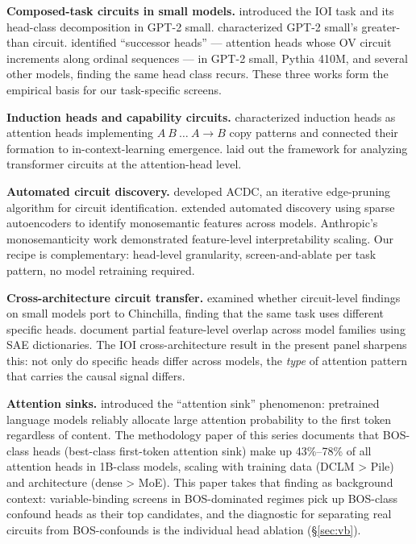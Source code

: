 \documentclass[11pt]{article}
\begin{document}
\textbf{Composed-task circuits in small models.} \citet{wang2022ioi} introduced the IOI task and its head-class decomposition in GPT-2 small. \citet{hanna2023greater} characterized GPT-2 small's greater-than circuit. \citet{gould2023successor} identified ``successor heads'' --- attention heads whose OV circuit increments along ordinal sequences --- in GPT-2 small, Pythia 410M, and several other models, finding the same head class recurs. These three works form the empirical basis for our task-specific screens.

\textbf{Induction heads and capability circuits.} \citet{olsson2022induction} characterized induction heads as attention heads implementing $A\ B\ \ldots\ A \to B$ copy patterns and connected their formation to in-context-learning emergence. \citet{elhage2021mathematical} laid out the framework for analyzing transformer circuits at the attention-head level.

\textbf{Automated circuit discovery.} \citet{conmy2023acdc} developed ACDC, an iterative edge-pruning algorithm for circuit identification. \citet{marks2024sparsefeature} extended automated discovery using sparse autoencoders to identify monosemantic features across models. Anthropic's monosemanticity work \citep{templeton2024monosemanticity} demonstrated feature-level interpretability scaling. Our recipe is complementary: head-level granularity, screen-and-ablate per task pattern, no model retraining required.

\textbf{Cross-architecture circuit transfer.} \citet{lieberum2023chinchilla} examined whether circuit-level findings on small models port to Chinchilla, finding that the same task uses different specific heads. \citet{marks2024sparsefeature} document partial feature-level overlap across model families using SAE dictionaries. The IOI cross-architecture result in the present panel sharpens this: not only do specific heads differ across models, the \emph{type} of attention pattern that carries the causal signal differs.

\textbf{Attention sinks.} \citet{xiao2024streaming} introduced the ``attention sink'' phenomenon: pretrained language models reliably allocate large attention probability to the first token regardless of content. The methodology paper of this series documents that BOS-class heads (best-class first-token attention sink) make up 43\%--78\% of all attention heads in 1B-class models, scaling with training data (DCLM > Pile) and architecture (dense > MoE). This paper takes that finding as background context: variable-binding screens in BOS-dominated regimes pick up BOS-class confound heads as their top candidates, and the diagnostic for separating real circuits from BOS-confounds is the individual head ablation (\S\ref{sec:vb}).
\end{document}
